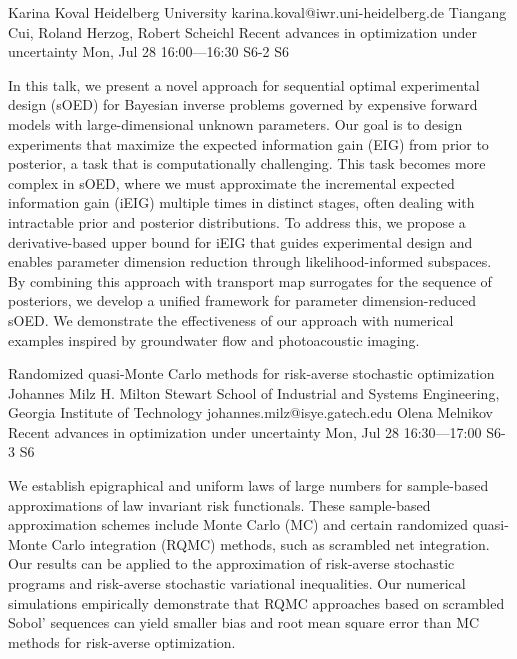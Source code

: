 \begin{talk}
  {Karina Koval}%
  {Heidelberg University}%
  {karina.koval@iwr.uni-heidelberg.de}%
  {Tiangang Cui, Roland Herzog, Robert Scheichl}%
  {Recent advances in optimization under uncertainty}%
  {}%
  {Mon, Jul 28 16:00---16:30}%
  {S6-2}%
  {S6}%
    
   
In this talk, we present a novel approach for sequential optimal experimental design (sOED) for Bayesian inverse problems governed by expensive forward models with large-dimensional unknown parameters. Our goal is to design experiments that maximize the expected information gain (EIG) from prior to posterior, a task that is computationally challenging. This task becomes more complex in sOED, where we must approximate the incremental expected information gain (iEIG) multiple times in distinct stages, often dealing with intractable prior and posterior distributions. To address this, we propose a derivative-based upper bound for iEIG that guides experimental design and enables parameter dimension reduction through likelihood-informed subspaces. By combining this approach with transport map surrogates for the sequence of posteriors, we develop a unified framework for parameter dimension-reduced sOED. We demonstrate the effectiveness of our approach with numerical examples inspired by groundwater flow and photoacoustic imaging.
\end{talk}

\begin{talk}
  {Randomized quasi-Monte Carlo methods for risk-averse stochastic optimization}%
  {Johannes Milz}%
  {H. Milton Stewart School of Industrial and Systems Engineering, Georgia Institute of Technology}%
  {johannes.milz@isye.gatech.edu}%
  {Olena Melnikov}%
  {Recent advances in optimization under uncertainty}%
  {Mon, Jul 28 16:30---17:00}%
  {S6-3}%
  {S6}%
    

We establish epigraphical and uniform laws of large numbers for sample-based approximations of law invariant risk functionals. These sample-based approximation schemes include Monte Carlo (MC) and certain randomized quasi-Monte Carlo integration (RQMC) methods, such as scrambled net integration. Our results can be applied to the approximation of risk-averse stochastic programs and risk-averse stochastic variational inequalities. Our numerical simulations empirically demonstrate that RQMC approaches based on scrambled Sobol' sequences can yield smaller bias and root mean square error than MC methods for risk-averse optimization.




\end{talk}

